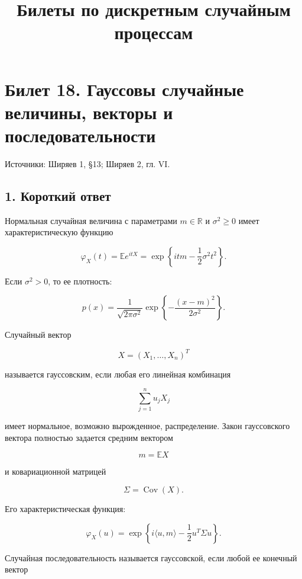 \documentclass[
  11pt,
  a4paper,
]{article}
\title{Билеты по дискретным случайным процессам}
\author{}
\date{}
\begin{document}
\maketitle

\section{Билет 18. Гауссовы случайные величины, векторы и
последовательности}\label{ux431ux438ux43bux435ux442-18.-ux433ux430ux443ux441ux441ux43eux432ux44b-ux441ux43bux443ux447ux430ux439ux43dux44bux435-ux432ux435ux43bux438ux447ux438ux43dux44b-ux432ux435ux43aux442ux43eux440ux44b-ux438-ux43fux43eux441ux43bux435ux434ux43eux432ux430ux442ux435ux43bux44cux43dux43eux441ux442ux438}

Источники: Ширяев 1, §13; Ширяев 2, гл. VI.

\subsection{1. Короткий
ответ}\label{ux43aux43eux440ux43eux442ux43aux438ux439-ux43eux442ux432ux435ux442}

Нормальная случайная величина с параметрами \(m\in\mathbb R\) и
\(\sigma^2\ge0\) имеет характеристическую функцию

\[
\varphi_X(t)
=
\mathbb E e^{itX}
=
\exp\left\{itm-\frac12\sigma^2t^2\right\}.
\]

Если \(\sigma^2>0\), то ее плотность:

\[
p(x)=\frac1{\sqrt{2\pi\sigma^2}}
\exp\left\{-\frac{(x-m)^2}{2\sigma^2}\right\}.
\]

Случайный вектор

\[
X=(X_1,\ldots,X_n)^T
\]

называется гауссовским, если любая его линейная комбинация

\[
\sum_{j=1}^n u_jX_j
\]

имеет нормальное, возможно вырожденное, распределение. Закон
гауссовского вектора полностью задается средним вектором

\[
m=\mathbb EX
\]

и ковариационной матрицей

\[
\Sigma=\operatorname{Cov}(X).
\]

Его характеристическая функция:

\[
\varphi_X(u)
=
\exp\left\{i\langle u,m\rangle-\frac12u^T\Sigma u\right\}.
\]

Случайная последовательность называется гауссовской, если любой ее
конечный вектор
\end{document}

